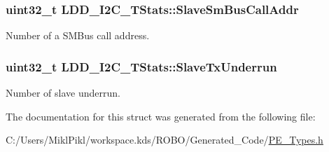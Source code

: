 \subsubsection[{Slave\+Sm\+Bus\+Call\+Addr}]{\setlength{\rightskip}{0pt plus 5cm}uint32\+\_\+t L\+D\+D\+\_\+\+I2\+C\+\_\+\+T\+Stats\+::\+Slave\+Sm\+Bus\+Call\+Addr}\label{struct_l_d_d___i2_c___t_stats_a134cb9fb9e37217e70e8a93924bca300}
Number of a S\+M\+Bus call address. \hypertarget{struct_l_d_d___i2_c___t_stats_add2f9914a1ea98c3bf86c0cab84e6a8c}{}
\subsubsection[{Slave\+Tx\+Underrun}]{\setlength{\rightskip}{0pt plus 5cm}uint32\+\_\+t L\+D\+D\+\_\+\+I2\+C\+\_\+\+T\+Stats\+::\+Slave\+Tx\+Underrun}\label{struct_l_d_d___i2_c___t_stats_add2f9914a1ea98c3bf86c0cab84e6a8c}
Number of slave underrun. 

The documentation for this struct was generated from the following file\+:\begin{DoxyCompactItemize}
\item 
C\+:/\+Users/\+Mikl\+Pikl/workspace.\+kds/\+R\+O\+B\+O/\+Generated\+\_\+\+Code/\hyperlink{_p_e___types_8h}{P\+E\+\_\+\+Types.\+h}\end{DoxyCompactItemize}
